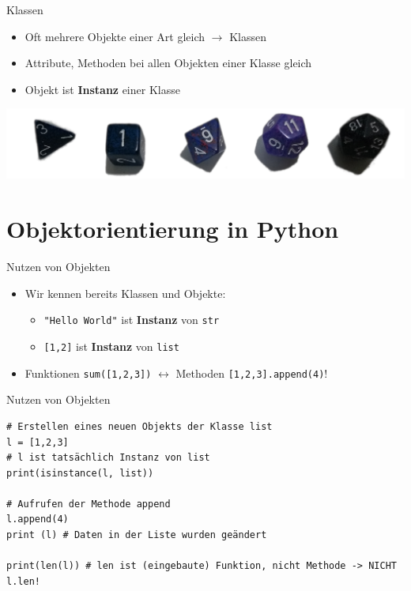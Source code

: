 \begin{frame}{Klassen}
    \begin{itemize}
        \item Oft mehrere Objekte einer Art gleich $\rightarrow$ Klassen
        \item Attribute, Methoden bei allen Objekten einer Klasse gleich
        \item Objekt ist \textbf{Instanz} einer Klasse
    \end{itemize}
    \includegraphics[width=\textwidth]{dice.jpg}
\end{frame}


\section{Objektorientierung in Python}
\begin{frame}{Nutzen von Objekten}
    \begin{itemize}
        \item Wir kennen bereits Klassen und Objekte:
        \begin{itemize}
            \item \texttt{"Hello World"} ist \textbf{Instanz} von \texttt{str}
            \item \texttt{[1,2]} ist \textbf{Instanz} von \texttt{list}
        \end{itemize}
        \item Funktionen \texttt{sum([1,2,3])} $\leftrightarrow$ Methoden \texttt{[1,2,3].append(4)}!
    \end{itemize} 
\end{frame}

\begin{frame}[fragile]{Nutzen von Objekten}
    \begin{lstlisting}
# Erstellen eines neuen Objekts der Klasse list
l = [1,2,3]
# l ist tatsächlich Instanz von list
print(isinstance(l, list))

# Aufrufen der Methode append
l.append(4)
print (l) # Daten in der Liste wurden geändert

print(len(l)) # len ist (eingebaute) Funktion, nicht Methode -> NICHT l.len!
    \end{lstlisting}
\end{frame}

